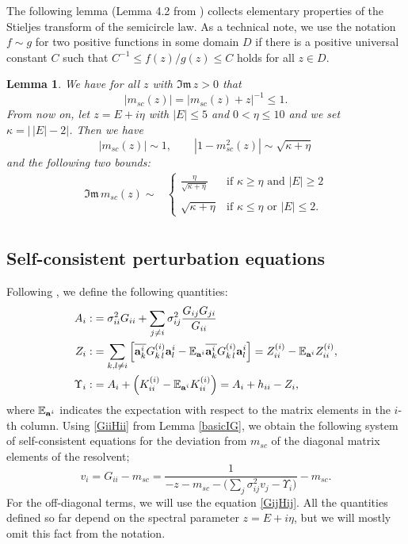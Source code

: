 \documentclass[draft]{article}
\newcommand{\non}{\nonumber}
\newcommand{\wH}{{K}}
\newcommand{\ba}{{\bf{a}}}
\newcommand{\be}{\begin{equation}}
\newcommand{\ee}{\end{equation}}
\newcommand{\ov}{\overline}
\newcommand{\im}{{\mathfrak{Im} \, }}
\newcommand{\E}{{\mathbb E }}
\newtheorem{lemma}[theorem]{Lemma}
\newcommand{\qed}{\hfill\fbox{}\par\vspace{0.3mm}}
\numberwithin{equation}{section}
\numberwithin{theorem}{section}
\numberwithin{definition}{section}
\numberwithin{remark}{section}
\begin{document}
\medskip


The following lemma (Lemma 4.2 from \cite{EYY2}) collects elementary properties of the 
Stieljes transform  of the semicircle law.  As a technical note, we use the notation $f\sim g$ 
 for two positive functions
in some domain $D$  if
there is a positive universal constant $C$ 
such that $C^{-1}\le f(z)/g(z) \le C$ holds for all $z\in D$.

  
\begin{lemma}\label{lm:msc}  We have for all $z$ with $\im z>0$ that
\be
   |m_{sc}(z)| = |m_{sc}(z)+z|^{-1}\le 1.
\label{zmsc2}
\ee
{F}rom  now on, let $z=E+i\eta$ with $|E|\le 5$ and $0<\eta \le 10$
and we set $\kappa= \big| \, |E|-2\big|$.
Then we  have
\be
   |m_{sc}(z)|\sim 1, \qquad   |1-m_{sc}^2(z)|\sim \sqrt{\kappa+\eta}
\label{smallz}
\ee
and the following two bounds: 
\begin{align}\label{esmallfake}
\im m_{sc} (z)\sim & \left\{\begin{array}{cc} 
 \frac{\eta}{\sqrt{\kappa+\eta}} & \mbox{if  $\kappa\ge\eta$ and $|E|\ge 2$} \\  & \\
\sqrt{\kappa+\eta} & \mbox{if $\kappa\le \eta$ or $|E|\le 2$.}
\end{array}
\right. \\ \non
\end{align}
\qed


\end{lemma}




\subsection{Self-consistent perturbation equations}

Following \cite{EYY, EYY2}, we define the following quantities: 
\begin{align}
   A_i: & =\sigma^2_{ii}G_{ii}+\sum_{j\neq i}\sigma^2_{ij}\frac{G_{ij}G_{ji}}{G_{ii}}
\label{defA} \\
  Z_i:& =  \sum_{k,l\ne i} 
\Big[ \ov{\ba^i_k} G^{(i)}_{k\,l}\ba^i_l-\E_{\ba^i} \ov{\ba^i_k} 
G^{(i)}_{k\,l}\ba^i_l\Big]=Z_{ii}^{(i)}-\E_{\ba^i} Z_{ii}^{(i)}, \label{defZi} \\
\Upsilon_i:& =A_i +
\left(\wH^{(i)}_{ii}-\E_{\ba^i}\wH^{(i)}_{ii}\right) = A_i +h_{ii}-Z_i ,
\label{seeqerror}
\end{align}
where $\E_{\ba^i}$ indicates the expectation with respect to the
matrix elements in the $i$-th column.
Using \eqref{GiiHii} from 
Lemma \ref{basicIG}, we obtain  the following  system of self-consistent  equations for the
deviation from $m_{sc}$ of the diagonal matrix elements of the resolvent;
\be\label{1}
  v_i = G_{ii} - m_{sc}
= \frac{1}{-z- m_{sc}- \Big(\sum_{j}\sigma^2_{ij}v_j-\Upsilon_i\Big)}
  - m_{sc} .
\ee
For the off-diagonal terms, we will use the equation \eqref{GijHij}. 
All the quantities defined so far depend on the spectral parameter $z=E+i\eta$, but
we will mostly omit this fact from the notation.
\end{document}
